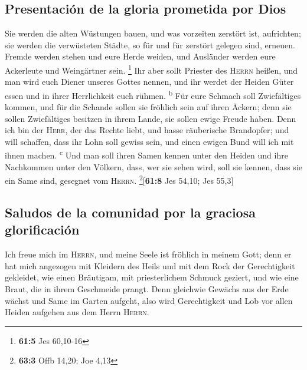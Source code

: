 \hypertarget{presentaciuxf3n-de-la-gloria-prometida-por-dios}{%
\subsection{Presentación de la gloria prometida por
Dios}\label{presentaciuxf3n-de-la-gloria-prometida-por-dios}}

 Sie werden die alten Wüstungen bauen, und was vorzeiten
zerstört ist, aufrichten; sie werden die verwüsteten Städte, so für und
für zerstört gelegen sind, erneuen.  Fremde werden stehen
und eure Herde weiden, und Ausländer werden eure Ackerleute und
Weingärtner sein. \footnote{\textbf{61:5} Jes 60,10-16} 
Ihr aber sollt Priester des \textsc{Herrn} heißen, und man wird euch
Diener unseres Gottes nennen, und ihr werdet der Heiden Güter essen und
in ihrer Herrlichkeit euch rühmen. \textsuperscript{b} 
Für eure Schmach soll Zwiefältiges kommen, und für die Schande sollen
sie fröhlich sein auf ihren Äckern; denn sie sollen Zwiefältiges
besitzen in ihrem Lande, sie sollen ewige Freude haben. 
Denn ich bin der \textsc{Herr}, der das Rechte liebt, und hasse
räuberische Brandopfer; und will schaffen, dass ihr Lohn soll gewiss
sein, und einen ewigen Bund will ich mit ihnen machen.
\textsuperscript{c}  Und man soll ihren Samen kennen unter
den Heiden und ihre Nachkommen unter den Völkern, dass, wer sie sehen
wird, soll sie kennen, dass sie ein Same sind, gesegnet vom
\textsc{Herrn}. \footnote{\textbf{63:3} Offb 14,20; Joe 4,13}{[}\textbf{61:8}
Jes 54,10; Jes 55,3{]}

\hypertarget{saludos-de-la-comunidad-por-la-graciosa-glorificaciuxf3n}{%
\subsection{Saludos de la comunidad por la graciosa
glorificación}\label{saludos-de-la-comunidad-por-la-graciosa-glorificaciuxf3n}}

 Ich freue mich im \textsc{Herrn}, und meine Seele ist
fröhlich in meinem Gott; denn er hat mich angezogen mit Kleidern des
Heils und mit dem Rock der Gerechtigkeit gekleidet, wie einen Bräutigam,
mit priesterlichem Schmuck geziert, und wie eine Braut, die in ihrem
Geschmeide prangt.  Denn gleichwie Gewächs aus der Erde
wächst und Same im Garten aufgeht, also wird Gerechtigkeit und Lob vor
allen Heiden aufgehen aus dem Herrn \textsc{Herrn}.


